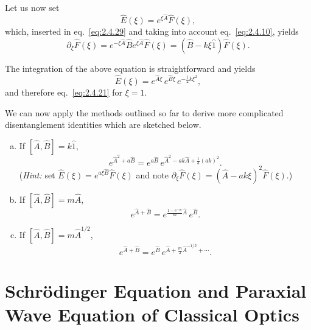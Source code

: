 Let us now set
\begin{equation}
\hat{E}(\xi)=e^{\xi\hat{A}}\hat{F}(\xi),
\label{eq:2.4.30}
\end{equation}
which, inserted in eq.~\eqref{eq:2.4.29} and taking into account eq.~\eqref{eq:2.4.10}, yields
\begin{equation}
\partial_{\xi}\hat{F}(\xi)
=e^{-\xi\hat{A}}\hat{B}e^{\xi\hat{A}}\hat{F}(\xi)
=(\hat{B}-k\xi\hat{1})\hat{F}(\xi).
\label{eq:2.4.31}
\end{equation}

The integration of the above equation is straightforward and yields
\begin{equation}
\hat{E}(\xi)=e^{\hat{A}\xi}\,e^{\hat{B}\xi}\,e^{-\frac{1}{2}k\xi^{2}},
\label{eq:2.4.32}
\end{equation}
and therefore eq.~\eqref{eq:2.4.21} for $\xi=1$.

We can now apply the methods outlined so far to derive more complicated disentanglement identities which are sketched below.

\begin{enumerate}[(a)]
\item If $[\hat{A},\hat{B}]=k\hat{1}$,
\begin{equation}
e^{\hat{A}^{2}+a\hat{B}}
=e^{a\hat{B}}\,e^{\hat{A}^{2}-a k\hat{A}+\frac{1}{3}(a k)^{2}}.
\label{eq:2.4.33}
\end{equation}
(\textit{Hint:} set $\hat{E}(\xi)=e^{a\xi\hat{B}}\hat{F}(\xi)$ and note
$\partial_{\xi}\hat{F}(\xi)=(\hat{A}-ak\xi)^{2}\hat{F}(\xi)$.)

\item If $[\hat{A},\hat{B}]=m\hat{A}$,
\begin{equation}
e^{\hat{A}+\hat{B}}
=e^{\frac{1-e^{-m}}{m}\hat{A}}\,e^{\hat{B}}.
\label{eq:2.4.34}
\end{equation}

\item If $[\hat{A},\hat{B}]=m\hat{A}^{1/2}$,
\begin{equation}
e^{\hat{A}+\hat{B}}
=e^{\hat{B}}\,e^{\hat{A}+\frac{m}{2}\hat{A}^{-1/2}+\cdots}.
\end{equation}
\end{enumerate}

\section{Schr\"odinger Equation and Paraxial Wave Equation of Classical Optics}

